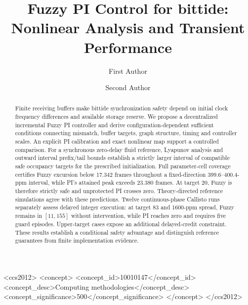 \documentclass[sigconf]{acmart}
\begin{document}
\title[Fuzzy PI Control for bittide]{Fuzzy PI Control for bittide: Nonlinear Analysis and Transient Performance}

\author{First Author}

\author{Second Author}

\renewcommand{\shortauthors}{First Author and Second Author}

\begin{abstract}
Finite receiving buffers make bittide synchronization safety depend on
initial clock frequency differences and available storage reserve.
We propose a decentralized incremental Fuzzy PI controller and derive
configuration-dependent sufficient conditions connecting mismatch,
buffer targets, graph structure, timing and controller scales.
An explicit PI calibration and exact nonlinear map support a controlled
comparison. For a synchronous zero-delay fluid reference, Lyapunov
analysis and outward interval prefix/tail bounds establish a strictly
larger interval of compatible safe occupancy targets for the prescribed
initialization. Full parameter-cell coverage certifies Fuzzy excursion
below 17.342 frames throughout a fixed-direction 399.6--400.4-ppm
interval, while PI's attained peak exceeds 23.380 frames. At target 20,
Fuzzy is therefore strictly safe and unprotected PI crosses zero.
Theory-directed reference simulations agree with these predictions.
Twelve continuous-phase Callisto runs separately assess delayed integer
execution: at target 83 and 1600-ppm spread, Fuzzy remains in $[11,155]$
without intervention, while PI reaches zero and requires five guard
episodes. Upper-target cases expose an additional delayed-credit
constraint. These results establish a conditional safety advantage
and distinguish reference guarantees from finite implementation evidence.
\end{abstract}


\begin{CCSXML}
<ccs2012>
 <concept>
  <concept_id>10010147</concept_id>
  <concept_desc>Computing methodologies</concept_desc>
  <concept_significance>500</concept_significance>
 </concept>
</ccs2012>
\end{CCSXML}
\end{document}
